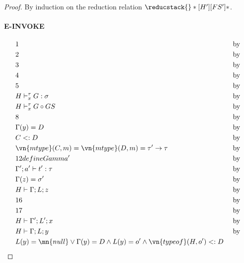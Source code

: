 \begin{proof}
By induction on the reduction relation $\reducstack{}*[H']{}[FS']*$.

\paragraph{E-INVOKE}

\begin{alignat}{3}
    &1 \label{pres-inv-xxxxxxx}
        && \text{ by }\\
    &2 \label{pres-inv-xxxxxxx}
        && \text{ by }\\
    &3 \label{pres-inv-xxxxxxx}
        && \text{ by }\\
    &4 \label{pres-inv-xxxxxxx}
        && \text{ by }\\
    &5 \label{pres-inv-xxxxxxx}
        && \text{ by }\\
    &H \vdash^\tau_x G : \sigma \label{pres-inv-xxxxxxx}
        && \text{ by }\\
    &H \vdash^\tau_x G \circ GS \label{pres-inv-7}
        && \text{ by }\\
    &8 \label{pres-inv-xxxxxxx}
        && \text{ by }\\
    &\Gamma(y) = D \label{pres-inv-xxxxxxx}
        && \text{ by }\\
    &C <: D \label{pres-inv-xxxxxxx}
        && \text{ by }\\
    &\vn{mtype}(C, m) = \vn{mtype}(D, m) = \tau' \rightarrow \tau \label{pres-inv-xxxxxxx}
        && \text{ by }\\
    &12 define Gamma' \label{pres-inv-xxxxxxx}
        && \text{ by }\\
    &\Gamma'; a' \vdash t' : \tau \label{pres-inv-xxxxxxx}
        && \text{ by }\\
    &\Gamma(z) = \sigma' \label{pres-inv-xxxxxxx}
        && \text{ by }\\
    &H \vdash \Gamma; L; z \label{pres-inv-xxxxxxx}
        && \text{ by }\\
    &16 \label{pres-inv-xxxxxxx}
        && \text{ by }\\
    &17 \label{pres-inv-xxxxxxx}
        && \text{ by }\\
    &H \vdash \Gamma'; L'; x \label{pres-inv-xxxxxxx}
        && \text{ by }\\
    &H \vdash \Gamma; L; y \label{pres-inv-xxxxxxx}
        && \text{ by }\\
    &L(y) = \mn{null} \vee \Gamma(y) = D \wedge L(y) = o' \wedge \vn{typeof}(H, o') <: D \label{pres-inv-xxxxxxx}

\end{alignat}
\end{proof}
